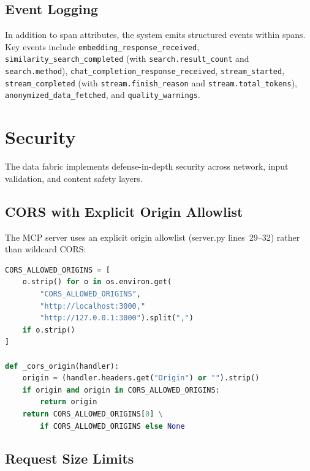 \documentclass[11pt]{article}
\newcommand{\code}[1]{\texttt{#1}}
\begin{document}
\subsection{Event Logging}

In addition to span attributes, the system emits structured events
within spans.  Key events include \code{embedding\_response\_received},
\code{similarity\_search\_completed} (with \code{search.result\_count}
and \code{search.method}), \code{chat\_completion\_response\_received},
\code{stream\_started}, \code{stream\_completed} (with
\code{stream.finish\_reason} and \code{stream.total\_tokens}),
\code{anonymized\_data\_fetched}, and \code{quality\_warnings}.


\section{Security}
\label{sec:security}

The data fabric implements defense-in-depth security across network,
input validation, and content safety layers.

\subsection{CORS with Explicit Origin Allowlist}

The MCP server uses an explicit origin allowlist (server.py lines~29--32)
rather than wildcard CORS:

\begin{lstlisting}[language=Python,caption={CORS allowlist (server.py lines 29--39)},label=lst:cors]
CORS_ALLOWED_ORIGINS = [
    o.strip() for o in os.environ.get(
        "CORS_ALLOWED_ORIGINS",
        "http://localhost:3000,"
        "http://127.0.0.1:3000").split(",")
    if o.strip()
]

def _cors_origin(handler):
    origin = (handler.headers.get("Origin") or "").strip()
    if origin and origin in CORS_ALLOWED_ORIGINS:
        return origin
    return CORS_ALLOWED_ORIGINS[0] \
        if CORS_ALLOWED_ORIGINS else None
\end{lstlisting}

\subsection{Request Size Limits}
\end{document}
